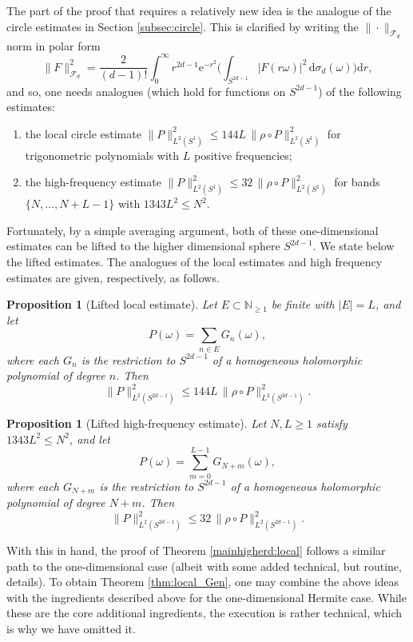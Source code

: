 \documentclass[11pt]{amsart}
\newtheorem{proposition}[theorem]{Proposition}
\theoremstyle{remark}
\newcommand{\N}{\mathbb{N}}
\newcommand{\abs}[1]{\lvert #1 \rvert}
\newcommand{\norm}[1]{\lVert #1 \rVert}
\newcommand{\dd}{\mathrm{d}}
\newcommand{\ee}{\mathrm{e}}
\newcommand{\rhoFn}{\rho}
\newcommand{\Fd}{\mathcal{F}_d}
\newcommand{\Sphere}{S^{2d-1}}
\begin{document}
The part of the proof that requires a relatively new idea is the analogue of the circle estimates in Section \ref{subsec:circle}. This is clarified by writing the $\|\cdot\|_{\mathcal{F}_d}$ norm in polar form
\begin{equation*}\label{eq:polard}
\norm{F}_{\Fd}^2
=
\frac{2}{(d-1)!}
\int_0^\infty
r^{2d-1} \ee^{-r^2}
\biggl(
\int_{\Sphere} \abs{F(r\omega)}^2\,\dd \sigma_d(\omega)
\biggr)\dd r,
\end{equation*}
and so, one needs analogues (which hold for functions on $S^{2d-1}$) of the following estimates:
\begin{enumerate}
\item the local circle estimate
$\norm{P}_{L^2(S^1)}^2 \le 144 L\, \norm{\rhoFn \circ P}_{L^2(S^1)}^2$
for trigonometric polynomials with $L$ positive frequencies;
\item the high-frequency estimate
$\norm{P}_{L^2(S^1)}^2 \le 32\, \norm{\rhoFn \circ P}_{L^2(S^1)}^2$
for bands $\{N,\dots,N+L-1\}$ with $1343L^2 \le N^2$.
\end{enumerate}
Fortunately, by a simple averaging argument, both of these one-dimensional estimates can be lifted to the higher dimensional sphere $S^{2d-1}$. We state below the lifted estimates. The analogues of the local estimates and high frequency estimates are given, respectively, as follows. %
\begin{proposition}[Lifted local estimate]\label{prop:lifted-local}
Let $E \subset \N_{\ge 1}$ be finite with $\abs{E} = L$, and let
\[
P(\omega) = \sum_{n \in E} G_n(\omega),
\]
where each $G_n$ is the restriction to $\Sphere$ of a homogeneous
holomorphic polynomial of degree $n$.  Then
\[
\norm{P}_{L^2(\Sphere)}^2
\le
144 L\, \norm{\rhoFn \circ P}_{L^2(\Sphere)}^2.
\]
\end{proposition}
\begin{proposition}[Lifted high-frequency estimate]\label{prop:lifted-high}
Let $N,L \ge 1$ satisfy $1343L^2 \le N^2$, and let
\[
P(\omega) = \sum_{m=0}^{L-1} G_{N+m}(\omega),
\]
where each $G_{N+m}$ is the restriction to $\Sphere$ of a homogeneous
holomorphic polynomial of degree $N+m$.  Then
\[
\norm{P}_{L^2(\Sphere)}^2
\le
32\, \norm{\rhoFn \circ P}_{L^2(\Sphere)}^2.
\]
\end{proposition}
With this in hand, the proof of Theorem \ref{mainhigherd:local} follows a similar path to the one-dimensional case (albeit with some added technical, but routine, details). To obtain Theorem \ref{thm:local_Gen}, one may combine the above ideas with the ingredients described above for the one-dimensional Hermite case. While these are the core additional ingredients, the execution is rather technical, which is why we have omitted it.
\end{document}
